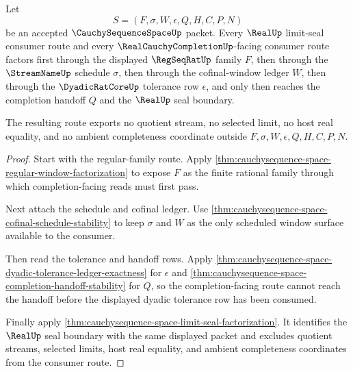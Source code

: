 \begin{theorem}
\label{thm:cauchysequence-space-regseqrat-streamname-real-seal-factorization}
Let
$$
S=(F,\sigma,W,\epsilon,Q,H,C,P,N)
$$
be an accepted $\CauchySequenceSpaceUp$ packet. Every $\RealUp$ limit-seal consumer route and every $\RealCauchyCompletionUp$-facing consumer route factors first through the displayed $\RegSeqRatUp$ family $F$, then through the $\StreamNameUp$ schedule $\sigma$, then through the cofinal-window ledger $W$, then through the $\DyadicRatCoreUp$ tolerance row $\epsilon$, and only then reaches the completion handoff $Q$ and the $\RealUp$ seal boundary.

The resulting route exports no quotient stream, no selected limit, no host real equality, and no ambient completeness coordinate outside $F,\sigma,W,\epsilon,Q,H,C,P,N$.
\end{theorem}
\begin{proof}
Start with the regular-family route. Apply \autoref{thm:cauchysequence-space-regular-window-factorization} to expose $F$ as the finite rational family through which completion-facing reads must first pass.

Next attach the schedule and cofinal ledger. Use \autoref{thm:cauchysequence-space-cofinal-schedule-stability} to keep $\sigma$ and $W$ as the only scheduled window surface available to the consumer.

Then read the tolerance and handoff rows. Apply \autoref{thm:cauchysequence-space-dyadic-tolerance-ledger-exactness} for $\epsilon$ and \autoref{thm:cauchysequence-space-completion-handoff-stability} for $Q$, so the completion-facing route cannot reach the handoff before the displayed dyadic tolerance row has been consumed.

Finally apply \autoref{thm:cauchysequence-space-limit-seal-factorization}. It identifies the $\RealUp$ seal boundary with the same displayed packet and excludes quotient streams, selected limits, host real equality, and ambient completeness coordinates from the consumer route.
\end{proof}

